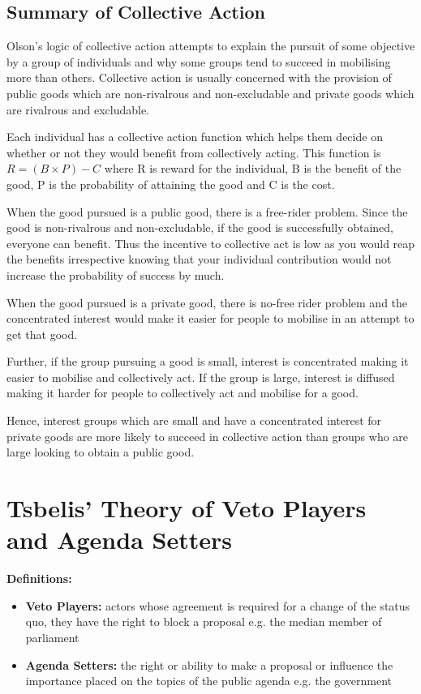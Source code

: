 \documentclass[12pt, letterpaper]{article}
\begin{document}
\subsection{Summary of Collective Action}
Olson's logic of collective action attempts to explain the pursuit of some objective by a group of individuals and why some groups tend to succeed in mobilising more than others. Collective action is usually concerned with the provision of public goods which are non-rivalrous and non-excludable and private goods which are rivalrous and excludable.

Each individual has a collective action function which helps them decide on whether or not they would benefit from collectively acting. This function is $R = (B \times P) - C$ where R is reward for the individual, B is the benefit of the good, P is the probability of attaining the good and C is the cost.

When the good pursued is a public good, there is a free-rider problem. Since the good is non-rivalrous and non-excludable, if the good is successfully obtained, everyone can benefit. Thus the incentive to collective act is low as you would reap the benefits irrespective knowing that your individual contribution would not increase the probability of success by much.
	
When the good pursued is a private good, there is no-free rider problem and the concentrated interest would make it easier for people to mobilise in an attempt to get that good.
	
Further, if the group pursuing a good is small, interest is concentrated making it easier to mobilise and collectively act. If the group is large, interest is diffused making it harder for people to collectively act and mobilise for a good.
	
Hence, interest groups which are small and have a concentrated interest for private goods are more likely to succeed in collective action than groups who are large looking to obtain a public good.


\newpage
\section{Tsbelis' Theory of Veto Players and Agenda Setters}
\textbf{Definitions:}
\begin{itemize}
	\item \textbf{Veto Players:} actors whose agreement is required for a change of the status quo, they have the right to block a proposal e.g. the median member of parliament
	\item \textbf{Agenda Setters:} the right or ability to make a proposal or influence the importance placed on the topics of the public agenda e.g. the government
\end{itemize}
\end{document}
